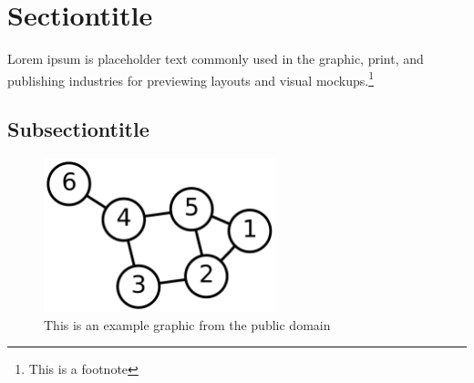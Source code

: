 \section{Sectiontitle}

Lorem ipsum is placeholder \cite{article} text commonly used in the graphic, print, and publishing industries for previewing layouts and visual mockups.\footnote{This is a footnote}

\subsection{Subsectiontitle}

\begin{figure}[H]
\centering
\includegraphics[width=0.6\textwidth]{pictures/example.png}
\caption{\label{fig:2x2 maze}This is an example graphic from the public domain}
\end{figure}











